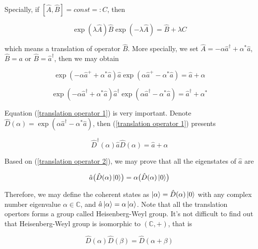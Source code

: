 \documentclass{article}
\begin{document}
        Specially, if $[\hat{A}, \hat{B}]=const=:C$, then 

        \begin{equation}
            \exp(\lambda\hat{A})\hat{B}\exp(-\lambda\hat{A}) = \hat{B} + \lambda C
        \end{equation}

        which means a translation of operator $\hat{B}$. More specially, we set $\hat{A}=-\alpha\hat{a}^\dagger+\alpha^*\hat{a}$, $\hat{B}=\hat{a}$ or $\hat{B}=\hat{a}^\dagger$, then we may obtain 

        \begin{equation}\label{translation operator 1}
            \exp(-\alpha\hat{a}^++\alpha^*\hat{a})\hat{a}\exp(\alpha\hat{a}^+-\alpha^*\hat{a}) = \hat{a}+\alpha
        \end{equation}

        \begin{equation}
            \exp(-\alpha\hat{a}^\dagger+\alpha^*\hat{a})\hat{a}^\dagger\exp(\alpha\hat{a}^\dagger-\alpha^*\hat{a}) = \hat{a}^\dagger+\alpha^*
        \end{equation}

        Equation (\ref{translation operator 1}) is very important. Denote $\hat{D}(\alpha)=\exp(\alpha\hat{a}^\dagger -\alpha^*\hat{a})$, then (\ref{translation operator 1}) presents

        \begin{equation}\label{translation operator 2}
            \hat{D}^\dagger(\alpha)\hat{a}\hat{D}(\alpha) = \hat{a} + \alpha
        \end{equation}

        Based on (\ref{translation operator 2}), we may prove that all the eigenstates of $\hat{a}$ are 

        \begin{equation}
            \hat{a} \bigl(\hat{D}(\alpha)\ket{0}\bigr) = \alpha \bigl(\hat{D}(\alpha)\ket{0}\bigr)
        \end{equation}

        Therefore, we may define the coherent states as $\ket{\alpha} = \hat{D}(\alpha)\ket{0}$ with any complex number eigenvalue $\alpha\in\mathbb{C}$, and $\hat{a}\ket{\alpha}=\alpha\ket{\alpha}$. Note that all the translation opertors forms a group called Heisenberg-Weyl group. It's not difficult to find out that Heisenberg-Weyl group is isomorphic to $(\mathbb{C}, +)$, that is 
        
        \begin{equation}        
            \hat{D}(\alpha)\hat{D}(\beta) = \hat{D}(\alpha+\beta)
        \end{equation}
\end{document}
